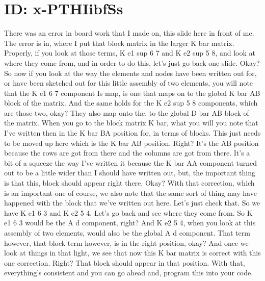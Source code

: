 \documentclass[10pt]{article}
\begin{document}
\section*{ID: x-PTHIibfSs}
There was an error in board work that I made on, this slide here in front of me. The error is in, where I put that block matrix in the larger K bar matrix. Properly, if you look at those terms, K e1 sup 6 7 and K e2 sup 5 8, and look at where they come from, and in order to do this, let's just go back one slide. Okay? So now if you look at the way the elements and nodes have been written out for, or have been sketched out for this little assembly of two elements, you will note that the K e1 6 7 component Is map, is one that maps on to the global K bar AB block of the matrix. And the same holds for the K e2 sup 5 8 components, which are those two, okay? They also map onto the, to the global D bar AB block of the matrix. When you go to the block matrix K bar, what you will you note that I've written then in the K bar BA position for, in terms of blocks. This just needs to be moved up here which is the K bar AB position. Right? It's the AB position because the rows are got from there and the columns are got from there. It's a bit of a squeeze the way I've written it because the  K bar AA component turned out to be a little wider than I should have written out, but, the important thing is that this, block should appear right there. Okay? With that correction, which is an important one of course, we also note that the same sort of thing may have happened with the block that we've written out here. Let's just check that. So we have K e1 6 3 and K e2 5 4. Let's go back and see where they come from. So K e1 6 3 would be the A d component, right? And K e2 5 4, when you look at this assembly of two elements, would also be the global A d component. That term however, that block term however, is in the right position, okay? And once we look at things in that light, we see that now this K bar matrix is correct with this one correction. Right? That block should appear in that position. With that, everything's consistent and you can go ahead and, program this into your code.
\end{document}
